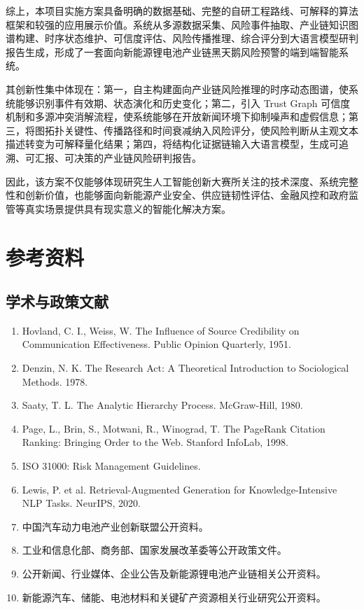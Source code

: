 \documentclass[12pt,a4paper]{article}
\begin{document}
综上，本项目实施方案具备明确的数据基础、完整的自研工程路线、可解释的算法框架和较强的应用展示价值。系统从多源数据采集、风险事件抽取、产业链知识图谱构建、时序状态维护、可信度评估、风险传播推理、综合评分到大语言模型研判报告生成，形成了一套面向新能源锂电池产业链黑天鹅风险预警的端到端智能系统。

其创新性集中体现在：第一，自主构建面向产业链风险推理的时序动态图谱，使系统能够识别事件有效期、状态演化和历史变化；第二，引入 Trust Graph 可信度机制和多源冲突消解流程，使系统能够在开放新闻环境下抑制噪声和虚假信息；第三，将图拓扑关键性、传播路径和时间衰减纳入风险评分，使风险判断从主观文本描述转变为可解释量化结果；第四，将结构化证据链输入大语言模型，生成可追溯、可汇报、可决策的产业链风险研判报告。

因此，该方案不仅能够体现研究生人工智能创新大赛所关注的技术深度、系统完整性和创新价值，也能够面向新能源产业安全、供应链韧性评估、金融风控和政府监管等真实场景提供具有现实意义的智能化解决方案。



\section{参考资料}
\subsection{学术与政策文献}
\begin{enumerate}
    \item Hovland, C. I., Weiss, W. The Influence of Source Credibility on Communication Effectiveness. Public Opinion Quarterly, 1951.
    \item Denzin, N. K. The Research Act: A Theoretical Introduction to Sociological Methods. 1978.
    \item Saaty, T. L. The Analytic Hierarchy Process. McGraw-Hill, 1980.
    \item Page, L., Brin, S., Motwani, R., Winograd, T. The PageRank Citation Ranking: Bringing Order to the Web. Stanford InfoLab, 1998.
    \item ISO 31000: Risk Management Guidelines.
    \item Lewis, P. et al. Retrieval-Augmented Generation for Knowledge-Intensive NLP Tasks. NeurIPS, 2020.
    \item 中国汽车动力电池产业创新联盟公开资料。
    \item 工业和信息化部、商务部、国家发展改革委等公开政策文件。
    \item 公开新闻、行业媒体、企业公告及新能源锂电池产业链相关公开资料。
    \item 新能源汽车、储能、电池材料和关键矿产资源相关行业研究公开资料。
\end{enumerate}
\end{document}
